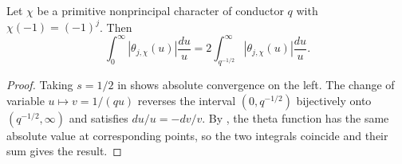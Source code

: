 \begin{lemma}
\label{lem:theta-integral-fold}
\emitthmsource
Let $\chi$ be a primitive nonprincipal character of conductor $q$ with $\chi(-1)=(-1)^j$. Then
\[
 \int_0^\infty|\theta_{j,\chi}(u)|\frac{du}{u}
 =2\int_{q^{-1/2}}^\infty|\theta_{j,\chi}(u)|\frac{du}{u}.
\]
\end{lemma}
\begin{proof}
Taking $s=1/2$ in  shows absolute convergence on the left.
The change of variable $u\mapsto v=1/(qu)$ reverses the interval $(0,q^{-1/2})$ bijectively onto $(q^{-1/2},\infty)$
and satisfies $du/u=-dv/v$. By , the theta function has the same absolute value at corresponding points,
so the two integrals coincide and their sum gives the result.
\end{proof}

